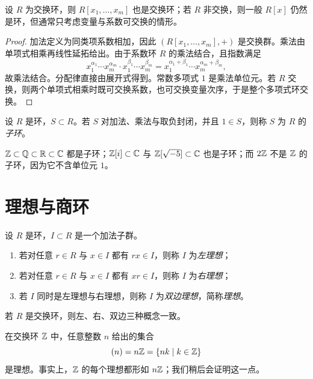\begin{proposition}
设 $R$ 为交换环，则 $R[x_1,\dots,x_m]$ 也是交换环；若 $R$ 非交换，则一般 $R[x]$ 仍然是环，但通常只考虑变量与系数可交换的情形。
\end{proposition}

\begin{proof}
加法定义为同类项系数相加，因此 $(R[x_1,\dots,x_m],+)$ 是交换群。乘法由单项式相乘再线性延拓给出。由于系数环 $R$ 的乘法结合，且指数满足
\[
x_1^{\alpha_1}\cdots x_m^{\alpha_m}\cdot x_1^{\beta_1}\cdots x_m^{\beta_m}
=x_1^{\alpha_1+\beta_1}\cdots x_m^{\alpha_m+\beta_m},
\]
故乘法结合。分配律直接由展开式得到。常数多项式 $1$ 是乘法单位元。若 $R$ 交换，则两个单项式相乘时既可交换系数，也可交换变量次序，于是整个多项式环交换。
\end{proof}

\begin{definition}
设 $R$ 是环，$S\subset R$。若 $S$ 对加法、乘法与取负封闭，并且 $1\in S$，则称 $S$ 为 $R$ 的\emph{子环}。
\end{definition}

\begin{example}
$\mathbb{Z}\subset \mathbb{Q}\subset \mathbb{R}\subset \mathbb{C}$ 都是子环；$\mathbb{Z}[i]\subset \mathbb{C}$ 与 $\mathbb{Z}[\sqrt{-5}]\subset \mathbb{C}$ 也是子环；而 $2\mathbb{Z}$ 不是 $\mathbb{Z}$ 的子环，因为它不含单位元 $1$。
\end{example}

\section{理想与商环}

\begin{definition}
设 $R$ 是环，$I\subset R$ 是一个加法子群。
\begin{enumerate}[label=\textnormal{(\arabic*)}]
  \item 若对任意 $r\in R$ 与 $x\in I$ 都有 $rx\in I$，则称 $I$ 为\emph{左理想}；
  \item 若对任意 $r\in R$ 与 $x\in I$ 都有 $xr\in I$，则称 $I$ 为\emph{右理想}；
  \item 若 $I$ 同时是左理想与右理想，则称 $I$ 为\emph{双边理想}，简称\emph{理想}。
\end{enumerate}
若 $R$ 是交换环，则左、右、双边三种概念一致。
\end{definition}

\begin{example}
在交换环 $\mathbb{Z}$ 中，任意整数 $n$ 给出的集合
\[
(n)=n\mathbb{Z}=\{nk\mid k\in \mathbb{Z}\}
\]
是理想。事实上，$\mathbb{Z}$ 的每个理想都形如 $n\mathbb{Z}$；我们稍后会证明这一点。
\end{example}

